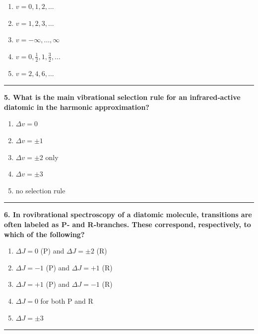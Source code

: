 \documentclass[
  english,
  9pt,
]{extbook}
\providecommand{\tightlist}{%
  \setlength{\itemsep}{0pt}\setlength{\parskip}{0pt}}
\theoremstyle{definition}
\theoremstyle{definition}
\theoremstyle{definition}
\theoremstyle{definition}
\theoremstyle{remark}
\begin{document}
\begin{enumerate}
\def\labelenumi{\alph{enumi}.}
\tightlist
\item
  \(v = 0, 1, 2, \dots\)
\item
  \(v = 1, 2, 3, \dots\)
\item
  \(v = -\infty, \dots, \infty\)
\item
  \(v = 0, \tfrac{1}{2}, 1, \tfrac{3}{2}, \dots\)
\item
  \(v = 2, 4, 6, \dots\)
\end{enumerate}

\begin{center}\rule{0.5\linewidth}{0.5pt}\end{center}

\textbf{5. What is the main vibrational selection rule for an infrared‑active diatomic in the harmonic approximation?}

\begin{enumerate}
\def\labelenumi{\alph{enumi}.}
\tightlist
\item
  \(\Delta v = 0\)
\item
  \(\Delta v = \pm 1\)
\item
  \(\Delta v = \pm 2\) only
\item
  \(\Delta v = \pm 3\)
\item
  no selection rule
\end{enumerate}

\begin{center}\rule{0.5\linewidth}{0.5pt}\end{center}

\textbf{6. In rovibrational spectroscopy of a diatomic molecule, transitions are often labeled as P‑ and R‑branches. These correspond, respectively, to which of the following?}

\begin{enumerate}
\def\labelenumi{\alph{enumi}.}
\tightlist
\item
  \(\Delta J = 0\) (P) and \(\Delta J = \pm 2\) (R)
\item
  \(\Delta J = -1\) (P) and \(\Delta J = +1\) (R)
\item
  \(\Delta J = +1\) (P) and \(\Delta J = -1\) (R)
\item
  \(\Delta J = 0\) for both P and R
\item
  \(\Delta J = \pm 3\)
\end{enumerate}

\begin{center}\rule{0.5\linewidth}{0.5pt}\end{center}
\end{document}
